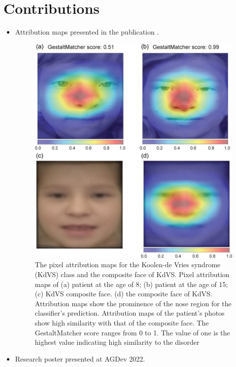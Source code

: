 \documentclass[../report.tex]{subfiles}
\begin{document}
    \chapter{Contributions}\label{ch_contributions}
    \begin{itemize}
    \item Attribution maps presented in the publication \cite{brand2022next}.
      \begin{figure}[H]
      	\centering
      	\includegraphics[scale=0.4]{images/kdvs.jpg}
      	\caption[The pixel attribution maps for the Koolen-de Vries syndrome (KdVS) class and the composite face of KdVS.]{The pixel attribution maps for the Koolen-de Vries syndrome (KdVS) class and the composite face of KdVS. Pixel attribution maps of (a) patient at the age of 8; (b) patient at the age of 15; (c) KdVS composite face. (d) the composite face of KdVS. Attribution maps show the prominence of the nose region for the classifier's prediction. Attribution maps of the patient's photos show high similarity with that of the composite face. The GestaltMatcher score ranges from 0 to 1. The value of one is the highest value indicating high similarity to the disorder}
      \end{figure}
  	\item Research poster presented at AGDev 2022.

\end{itemize}
\end{document}
